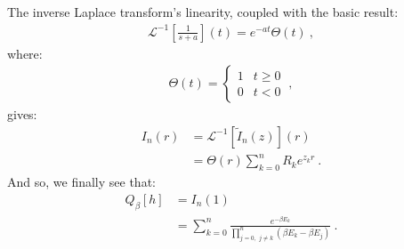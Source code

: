 \documentclass[draft,nofootinbib,pre,twocolumn,showpacs,showkeys,groupaddress,preprintnumbers,floatfix]{revtex4-1}
\newcommand{\1}{\mathbbm{1}}
\begin{document}
The inverse Laplace transform's linearity, coupled with the basic result:
\begin{align*}
\mathcal{L}^{-1}\left[\frac{1}{s+a}\right](t) = e^{-at}\Theta(t)
  ~,
\end{align*}
where:
\begin{align*}
\Theta(t) = \begin{cases}
  1 & t \geq 0 \\
  0 & t < 0
  \end{cases}
  ~,
\end{align*}
gives:
\begin{align*}
I_n(r) & = \mathcal{L}^{-1}[\tilde{I}_n(z)](r) \\
  & = \Theta(r) \sum_{k=0}^n R_k e^{z_k r}
  ~.
\end{align*}
And so, we finally see that:
\begin{align*}
Q_\beta[h] & = I_n(1) \\
  & = \sum_{k=0}^n
  \frac{ e^{-\beta E_k} }{\prod_{j=0, \,\, j \neq k}^n (\beta E_k - \beta E_j)}
  ~.
\end{align*}


\end{document}

